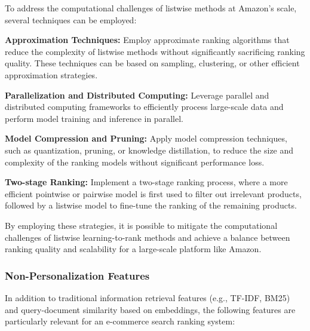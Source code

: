 \documentclass[12pt]{article}
\begin{document}
To address the computational challenges of listwise methods at Amazon's scale, several techniques can be employed:

\textbf{Approximation Techniques:} Employ approximate ranking algorithms that reduce the complexity of listwise methods without significantly sacrificing ranking quality. These techniques can be based on sampling, clustering, or other efficient approximation strategies.

\textbf{Parallelization and Distributed Computing:} Leverage parallel and distributed computing frameworks to efficiently process large-scale data and perform model training and inference in parallel.

\textbf{Model Compression and Pruning:} Apply model compression techniques, such as quantization, pruning, or knowledge distillation, to reduce the size and complexity of the ranking models without significant performance loss.

\textbf{Two-stage Ranking:} Implement a two-stage ranking process, where a more efficient pointwise or pairwise model is first used to filter out irrelevant products, followed by a listwise model to fine-tune the ranking of the remaining products.

By employing these strategies, it is possible to mitigate the computational challenges of listwise learning-to-rank methods and achieve a balance between ranking quality and scalability for a large-scale platform like Amazon.

\subsubsection{Non-Personalization Features}
 In addition to traditional information retrieval features (e.g., TF-IDF, BM25) and query-document similarity based on embeddings, the following features are particularly relevant for an e-commerce search ranking system:
\end{document}
